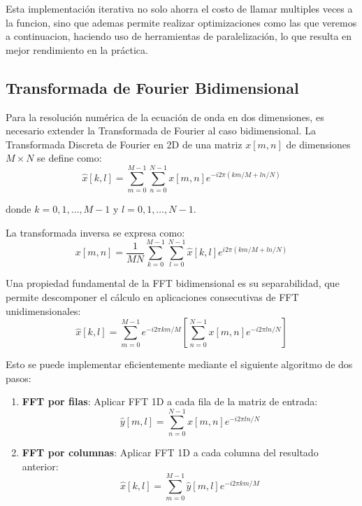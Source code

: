 \documentclass[a4paper]{article}
\begin{document}
Esta implementación iterativa no solo ahorra el costo de llamar multiples veces a la funcion, sino que ademas permite realizar optimizaciones como las que veremos a continuacion,
haciendo uso de herramientas de paralelización, lo que resulta en mejor rendimiento en la práctica.

\subsection{Transformada de Fourier Bidimensional}

Para la resolución numérica de la ecuación de onda en dos dimensiones, es necesario extender la Transformada de Fourier al caso bidimensional. La Transformada Discreta de Fourier en 2D de una matriz $x[m,n]$ de dimensiones $M \times N$ se define como:
\begin{equation}
    \hat{x}[k,l] = \sum_{m=0}^{M-1} \sum_{n=0}^{N-1} x[m,n] e^{-i2\pi (km/M + ln/N)}
\end{equation}

donde $k = 0, 1, \ldots, M-1$ y $l = 0, 1, \ldots, N-1$.

La transformada inversa se expresa como:
\begin{equation}
    x[m,n] = \frac{1}{MN} \sum_{k=0}^{M-1} \sum_{l=0}^{N-1} \hat{x}[k,l] e^{i2\pi (km/M + ln/N)}
\end{equation}

Una propiedad fundamental de la FFT bidimensional es su separabilidad, que permite descomponer el cálculo en aplicaciones consecutivas de FFT unidimensionales:
\begin{equation}
    \hat{x}[k,l] = \sum_{m=0}^{M-1} e^{-i2\pi km/M} \left[ \sum_{n=0}^{N-1} x[m,n] e^{-i2\pi ln/N} \right]
\end{equation}

Esto se puede implementar eficientemente mediante el siguiente algoritmo de dos pasos:

\begin{enumerate}
    \item \textbf{FFT por filas}: Aplicar FFT 1D a cada fila de la matriz de entrada:
          \begin{equation}
              \hat{y}[m,l] = \sum_{n=0}^{N-1} x[m,n] e^{-i2\pi ln/N}
          \end{equation}

    \item \textbf{FFT por columnas}: Aplicar FFT 1D a cada columna del resultado anterior:
          \begin{equation}
              \hat{x}[k,l] = \sum_{m=0}^{M-1} \hat{y}[m,l] e^{-i2\pi km/M}
          \end{equation}
\end{enumerate}
\end{document}
